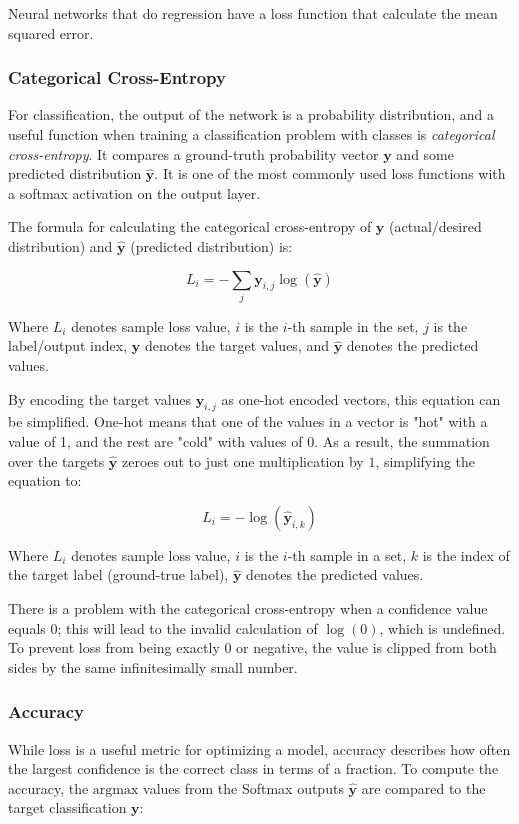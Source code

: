 \documentclass[a4paper]{report}
\newcommand{\vect}[1]{\bm{#1}}
\begin{document}
Neural networks that do regression have a loss function that calculate the mean squared error.

\subsubsection*{Categorical Cross-Entropy}
For classification, the output of the network is a probability distribution, and a useful function when training a classification problem with classes is \emph{categorical cross-entropy}. It compares a ground-truth probability vector $\vect{y}$ and some predicted distribution $\vect{\hat{y}}$. It is one of the most commonly used loss functions with a softmax activation on the output layer.

The formula for calculating the categorical cross-entropy of $\vect{y}$ (actual/desired distribution) and $\vect{\hat{y}}$ (predicted distribution) is:

\begin{equation*}
    L_i = -\sum_{j} \vect{y}_{i,j} \log({\vect{\hat{y}}})
\end{equation*}

Where $L_i$ denotes sample loss value, $i$ is the $i$-th sample in the set, $j$ is the label/output index, $\vect{y}$ denotes the target values, and $\vect{\hat{y}}$ denotes the predicted values.

By encoding the target values $\vect{y}_{i,j}$ as one-hot encoded vectors, this equation can be simplified. One-hot means that one of the values in a vector is "hot" with a value of 1, and the rest are "cold" with values of 0. As a result, the summation over the targets $\vect{\hat{y}}$ zeroes out to just one multiplication by $1$, simplifying the equation to:

\begin{equation*}
    L_i = -\log(\vect{\hat{y}}_{i,k})
\end{equation*}

Where $L_i$ denotes sample loss value, $i$ is the $i$-th sample in a set, $k$ is the index of the target label (ground-true label), $\vect{\hat{y}}$ denotes the predicted values.

There is a problem with the categorical cross-entropy when a confidence value equals $0$; this will 
lead to the invalid calculation of $\log(0)$, which is undefined. To prevent loss from being exactly $0$ or negative, the value is clipped from both sides by the same infinitesimally small number.

\subsubsection*{Accuracy}
While loss is a useful metric for optimizing a model, accuracy describes how often the largest 
confidence is the correct class in terms of a fraction. To compute the accuracy, the $\text{argmax}$ values from the Softmax outputs $\vect{\hat{y}}$ are compared to the target classification $\vect{y}$:
\end{document}

